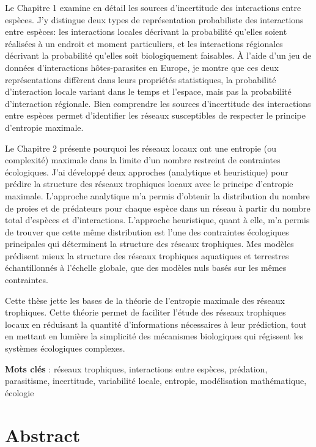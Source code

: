 \documentclass[12pt,twoside,phd]{dms}
\numberwithin{equation}{section}
\numberwithin{table}{chapter}
\numberwithin{figure}{chapter}
\begin{document}
Le Chapitre 1 examine en détail les sources d'incertitude des interactions entre
espèces. J'y distingue deux types de représentation probabiliste des
interactions entre espèces: les interactions locales décrivant la probabilité
qu'elles soient réalisées à un endroit et moment particuliers, et les
interactions régionales décrivant la probabilité qu'elles soit biologiquement
faisables. À l'aide d'un jeu de données d'interactions hôtes-parasites en
Europe, je montre que ces deux représentations diffèrent dans leurs propriétés
statistiques, la probabilité d'interaction locale variant dans le temps et
l'espace, mais pas la probabilité d'interaction régionale. Bien comprendre les
sources d'incertitude des interactions entre espèces permet d'identifier les
réseaux susceptibles de respecter le principe d'entropie maximale.

Le Chapitre 2 présente pourquoi les réseaux locaux ont une entropie (ou
complexité) maximale dans la limite d'un nombre restreint de contraintes
écologiques. J'ai développé deux approches (analytique et heuristique) pour
prédire la structure des réseaux trophiques locaux avec le principe d'entropie
maximale. L'approche analytique m'a permis d'obtenir la distribution du nombre
de proies et de prédateurs pour chaque espèce dans un réseau à partir du nombre
total d'espèces et d'interactions. L'approche heuristique, quant à elle, m'a
permis de trouver que cette même distribution est l'une des contraintes
écologiques principales qui déterminent la structure des réseaux trophiques. Mes
modèles prédisent mieux la structure des réseaux trophiques aquatiques et
terrestres échantillonnés à l'échelle globale, que des modèles nuls basés sur
les mêmes contraintes.

Cette thèse jette les bases de la théorie de l'entropie maximale des réseaux
trophiques. Cette théorie permet de faciliter l'étude des réseaux trophiques
locaux en réduisant la quantité d'informations nécessaires à leur prédiction,
tout en mettant en lumière la simplicité des mécanismes biologiques qui
régissent les systèmes écologiques complexes.

\textbf{Mots clés} : réseaux trophiques, interactions entre espèces, prédation, parasitisme, incertitude, variabilité locale, entropie, modélisation mathématique, écologie


\anglais
\chapter*{Abstract}
\end{document}
